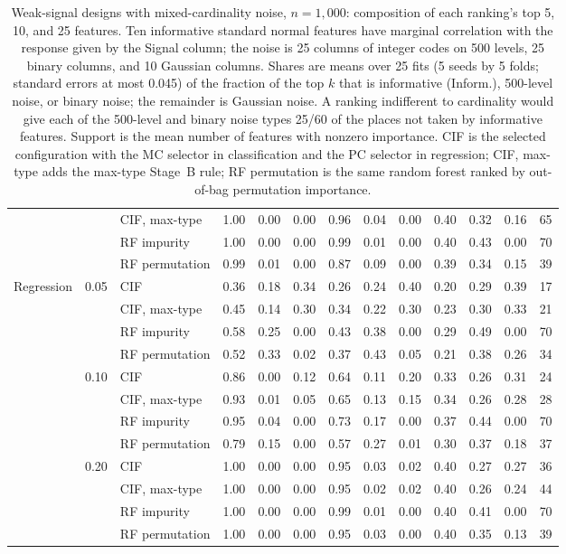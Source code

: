 \begin{table}[tb]
\begin{tabular}{@{}lrlrrrrrrrrrr@{}}
     &  & CIF, max-type & 1.00 & 0.00 & 0.00 & 0.96 & 0.04 & 0.00 & 0.40 & 0.32 & 0.16 & 65 \\
     &  & RF impurity & 1.00 & 0.00 & 0.00 & 0.99 & 0.01 & 0.00 & 0.40 & 0.43 & 0.00 & 70 \\
     &  & RF permutation & 0.99 & 0.01 & 0.00 & 0.87 & 0.09 & 0.00 & 0.39 & 0.34 & 0.15 & 39 \\
    \addlinespace
    Regression & 0.05 & CIF & 0.36 & 0.18 & 0.34 & 0.26 & 0.24 & 0.40 & 0.20 & 0.29 & 0.39 & 17 \\
     &  & CIF, max-type & 0.45 & 0.14 & 0.30 & 0.34 & 0.22 & 0.30 & 0.23 & 0.30 & 0.33 & 21 \\
     &  & RF impurity & 0.58 & 0.25 & 0.00 & 0.43 & 0.38 & 0.00 & 0.29 & 0.49 & 0.00 & 70 \\
     &  & RF permutation & 0.52 & 0.33 & 0.02 & 0.37 & 0.43 & 0.05 & 0.21 & 0.38 & 0.26 & 34 \\
     & 0.10 & CIF & 0.86 & 0.00 & 0.12 & 0.64 & 0.11 & 0.20 & 0.33 & 0.26 & 0.31 & 24 \\
     &  & CIF, max-type & 0.93 & 0.01 & 0.05 & 0.65 & 0.13 & 0.15 & 0.34 & 0.26 & 0.28 & 28 \\
     &  & RF impurity & 0.95 & 0.04 & 0.00 & 0.73 & 0.17 & 0.00 & 0.37 & 0.44 & 0.00 & 70 \\
     &  & RF permutation & 0.79 & 0.15 & 0.00 & 0.57 & 0.27 & 0.01 & 0.30 & 0.37 & 0.18 & 37 \\
     & 0.20 & CIF & 1.00 & 0.00 & 0.00 & 0.95 & 0.03 & 0.02 & 0.40 & 0.27 & 0.27 & 36 \\
     &  & CIF, max-type & 1.00 & 0.00 & 0.00 & 0.95 & 0.02 & 0.02 & 0.40 & 0.26 & 0.24 & 44 \\
     &  & RF impurity & 1.00 & 0.00 & 0.00 & 0.99 & 0.01 & 0.00 & 0.40 & 0.41 & 0.00 & 70 \\
     &  & RF permutation & 1.00 & 0.00 & 0.00 & 0.95 & 0.03 & 0.00 & 0.40 & 0.35 & 0.13 & 39 \\
    \bottomrule
  \end{tabular}
  \caption{Weak-signal designs with mixed-cardinality noise, $n = 1{,}000$:
  composition of each ranking's top 5, 10, and 25 features. Ten informative
  standard normal features have marginal correlation with the response given by
  the Signal column; the noise is 25 columns of integer codes on 500 levels, 25
  binary columns, and 10 Gaussian columns. Shares are means over 25 fits (5
  seeds by 5 folds; standard errors at most 0.045) of the fraction of the top $k$
  that is informative (Inform.), 500-level noise, or binary noise; the remainder
  is Gaussian noise. A ranking indifferent to cardinality would give each of
  the 500-level and binary noise types 25/60 of the places not taken by
  informative features. Support is the mean number of features with nonzero
  importance. CIF is the selected configuration with the MC selector in
  classification and the PC selector in regression; CIF, max-type adds the
  max-type Stage~B rule; RF permutation is the same random forest ranked by
  out-of-bag permutation importance.}
  \label{tab:weak-signal-cardinality}
\end{table}

